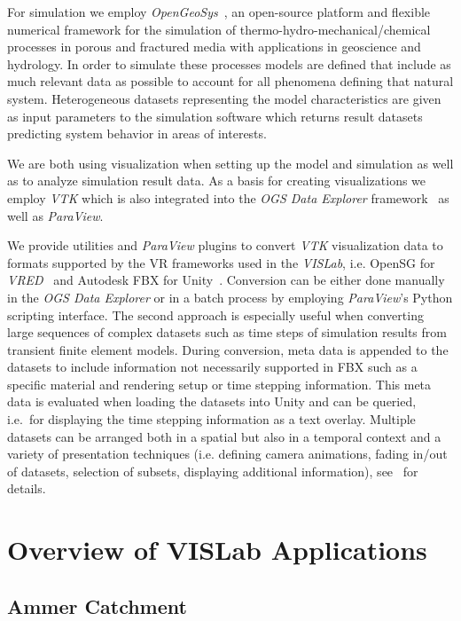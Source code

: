 \documentclass[twocolumn]{svjour3}          %
\begin{document}
For simulation we employ \emph{OpenGeoSys}~\cite{kolditz:ogs}, an open-source platform and flexible numerical framework for the simulation of thermo-hydro-mechanical/chemical processes in porous and fractured media with applications in geoscience and hydrology. In order to simulate these processes models are defined that include as much relevant data as possible to account for all phenomena defining that natural system. Heterogeneous datasets representing the model characteristics are given as input parameters to the simulation software which returns result datasets predicting system behavior in areas of interests.

We are both using visualization when setting up the model and simulation as well as to analyze simulation result data. As a basis for creating visualizations we employ \emph{VTK} which is also integrated into the \emph{OGS Data Explorer} framework~\cite{rink:eesenvirvis} as well as \emph{ParaView}.

We provide utilities and \emph{ParaView} plugins to convert \emph{VTK} visualization data to formats supported by the VR frameworks used in the \emph{VISLab}, i.e. OpenSG for \emph{VRED}~\cite{bilke:vtkosgconverter} and Autodesk FBX for Unity~\cite{bilke:vtkfbxconverter}. Conversion can be either done manually in the \emph{OGS Data Explorer} or in a batch process by employing \emph{ParaView}'s Python scripting interface. The second approach is especially useful when converting large sequences of complex datasets such as time steps of simulation results from transient finite element models. During conversion, meta data is appended to the datasets to include information not necessarily supported in FBX such as a specific material and rendering setup or time stepping information. This meta data is evaluated when loading the datasets into Unity and can be queried, i.e.~for displaying the time stepping information as a text overlay. Multiple datasets can be arranged both in a spatial but also in a temporal context and a variety of presentation techniques (i.e. defining camera animations, fading in/out of datasets, selection of subsets, displaying additional information), see~\cite{rink:eesenvirvis} for details.

\section{Overview of VISLab Applications}
\label{overview-of-VISLab-applications}

\subsection{Ammer Catchment}
\label{ammer-catchment}
\end{document}

